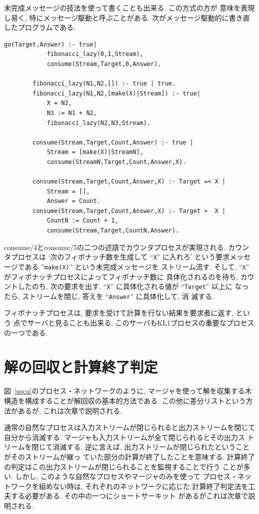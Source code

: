 \documentclass[a4,titlepage]{jsreport}
\newenvironment{program}{\begin{quote}}{\end{quote}}
\begin{document}
未完成メッセージの技法を使って書くことも出来る.  この方式の方が
意味を表現し易く, 特にメッセージ駆動と呼ぶことがある.
  次がメッセージ駆動的に書き直したプログラムである.

\begin{Verbatim}[baselinestretch=0.8]
        go(Target,Answer) :- true|
            fibonacci_lazy(0,1,Stream),
            consume(Stream,Target,0,Answer).
        
        fibonacci_lazy(N1,N2,[]) :- true | true.
        fibonacci_lazy(N1,N2,[make(X)|Stream]) :- true|
            X = N2,
            N3 := N1 + N2,
            fibonacci_lazy(N2,N3,Stream).
        
        consume(Stream,Target,Count,Answer) :- true | 
            Stream = [make(X)|StreamN],
            consume(StreamN,Target,Count,Answer,X).
        
        consume(Stream,Target,Count,Answer,X) :- Target =< X |
            Stream = [],
            Answer = Count.
        consume(Stream,Target,Count,Answer,X) :- Target >  X |
            CountN := Count + 1,
            consume(Stream,Target,CountN,Answer).
\end{Verbatim}

consume/4とconsume/5の二つの述語でカウンタプロセスが実現される.  
カウンタプロセスは `次のフィボナッチ数を生成して ``\verb!X!'' に入れろ'
という要求メッセージである ''\verb!make(X)!'' という未完成メッセージを
ストリーム流す.  そして, 
 ``\verb!X!'' がフィボナッチプロセスによってフィボナッチ数に
具体化されるのを待ち, カウントしたのち, 次の要求を出す.  
 ``\verb!X!'' に具体化される値が ``\verb!Target!'' 以上に
なったら, ストリームを閉じ, 答えを ``\verb!Answer!'' に具体化して, 消
滅する.   

フィボナッチプロセスは, 要求を受けて計算を行ない結果を要求者に返す, という
点でサーバと見ることも出来る.  このサーバもKL1プロセスの重要なプロセス
の一つである.  

\section{解の回収と計算終了判定}
図~\ref{sqcu}のプロセス・ネットワークのように, 
マージャを使って解を収集する木構造を構成することが解回収の基本的方法である.  
この他に差分リストという方法があるが, これは次章で説明される.  

通常の自然なプロセスは入力ストリームが閉じられると出力ストリームを閉じて
自分から消滅する.  マージャも入力ストリームが全て閉じられるとその出力ス
トリームを閉じて消滅する.  
逆に言えば, 出力ストリームが閉じられたということがそのストリームが継っ
ていた部分の計算が終了したことを意味する.  
計算終了の判定はこの出力ストリームが閉じられることを監視することで行う
ことが多い.  しかし, このような自然なプロセスやマージャのみを使って
プロセス・ネットワークを組めない時は, それぞれのネットワークに応じた
計算終了判定法を工夫する必要がある.  その中の一つにショートサーキット
があるがこれは次章で説明される.  
\end{document}
